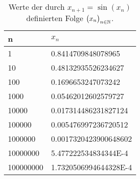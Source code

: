 \begin{table}
  \centering
  \begin{tabular}{|l|l|}
    \hline
    n  &  $x_n$ \\
    \hline
    \hline
        1 & 0.8414709848078965 \\
  \hline
       10 & 0.48132935526234627 \\
  \hline
      100 & 0.1696653247073242  \\
  \hline
     1000 & 0.05462012602579727   \\
  \hline
    10000 & 0.017314486231827124 \\
  \hline
   100000 & 0.005476997236720512 \\
  \hline
  1000000 &  0.0017320423900648602 \\
  \hline
 10000000 & 5.477222534834344E-4  \\
  \hline 
100000000 & 1.7320506994644328E-4 \\
  \hline
  \end{tabular}
  \caption{Werte der durch $x_{n+1} = \sin(x_n)$ definierten Folge $\bigl(x_n\bigr)_{n\in\mathbb{N}}$.}
  \label{tab:sinXisX}
\end{table}




